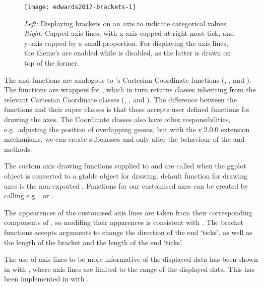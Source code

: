 \begin{figure}[h!]


\texttt{[image: edwards2017-brackets-1]} 
\caption{
  \emph{Left:} Displaying brackets on an axis to indicate categorical values.
  \emph{Right:} Capped axis lines, with x-axis capped at right-most tick, and
               y-axis capped by a small proportion.
  For displaying the axis lines, the theme's  are enabled
  while  is disabled, as the latter is drawn on top of the former.
}
\label{fig:brackets}
\end{figure}

The  and  functions are
analogous to 's Cartesian Coordinate functions
(, , and ).
The  functions are wrappers for
, which in turn returns classes inheriting from the
relevant Cartesian Coordinate classes (,
, and ). The difference between the
 functions and their super classes is that these
accepts user defined functions for drawing the axes. The Coordinate
classes also have other responsibilities, e.g.~adjusting the position of
overlapping geoms, but with the  v.2.0.0 extension
mechanisms, we can create subclasses and only alter the behaviour of the
 and  methods.

The custom axis drawing functions supplied to  and
 are called when the ggplot object is converted
to a gtable object for drawing.  default function for
drawing axes is the non-exported . Functions for our
customised axes can be created by calling e.g.~
or .

The appearences of the customised axis lines are taken from their
corresponding components of , so modifing their apparences
is consistent with . 
The bracket functions accepts arguments to change the direction of the end `ticks',
as well as the length of the bracket and the length of the end `ticks'.

The use of axis lines to be more informative of the displayed data has
been shown in \citet[p.\,130]{Tufte2001} with , where
axis lines are limited to the range of the displayed data. This has been
implemented in  \citep{ggthemes} with
.


